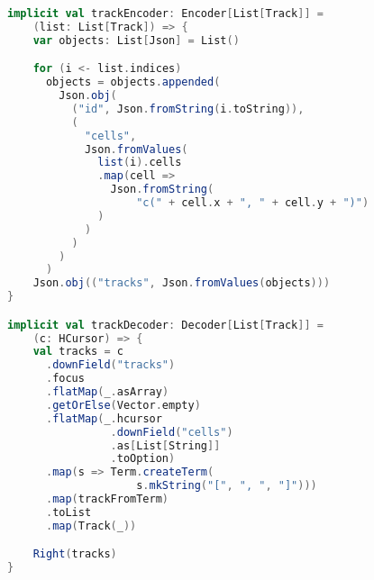 \usepackage{listings}\begin{lstlisting}[language=Scala, caption=Impliciti per le operazioni di codifica, label=code:coder]
implicit val trackEncoder: Encoder[List[Track]] =
    (list: List[Track]) => {
    var objects: List[Json] = List()

    for (i <- list.indices)
      objects = objects.appended(
        Json.obj(
          ("id", Json.fromString(i.toString)),
          (
            "cells",
            Json.fromValues(
              list(i).cells
              .map(cell =>
                Json.fromString(
                    "c(" + cell.x + ", " + cell.y + ")")
              )
            )
          )
        )
      )
    Json.obj(("tracks", Json.fromValues(objects)))
}

implicit val trackDecoder: Decoder[List[Track]] =
    (c: HCursor) => {
    val tracks = c
      .downField("tracks")
      .focus
      .flatMap(_.asArray)
      .getOrElse(Vector.empty)
      .flatMap(_.hcursor
                .downField("cells")
                .as[List[String]]
                .toOption)
      .map(s => Term.createTerm(
                    s.mkString("[", ", ", "]")))
      .map(trackFromTerm)
      .toList
      .map(Track(_))

    Right(tracks)
}
\end{lstlisting}